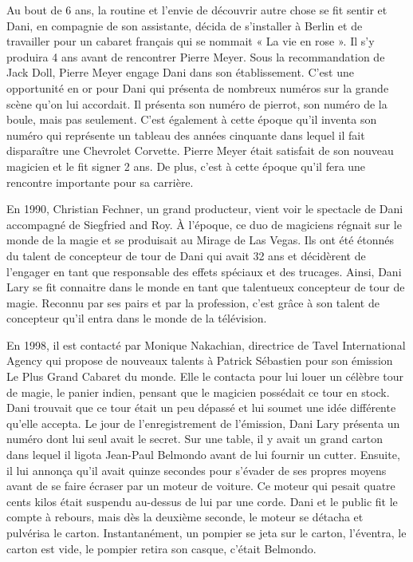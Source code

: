 Au bout de 6 ans, la routine et l’envie de découvrir autre chose se fit sentir et Dani, en compagnie de son assistante, décida de s’installer à Berlin et de travailler pour un cabaret français qui se nommait « La vie en rose ». Il s’y produira 4 ans avant de rencontrer Pierre Meyer. Sous la recommandation de Jack Doll, Pierre Meyer engage Dani dans son établissement. C’est une opportunité en or pour Dani qui présenta de nombreux numéros sur la grande scène qu'on lui accordait. Il présenta son numéro de pierrot, son numéro de la boule, mais pas seulement. C’est également à cette époque qu’il inventa son numéro qui représente un tableau des années cinquante dans lequel il fait disparaître une Chevrolet Corvette. Pierre Meyer était satisfait de son nouveau magicien et le fit signer 2 ans. De plus, c'est à cette époque qu’il fera une rencontre importante pour sa carrière.

En 1990, Christian Fechner, un grand producteur, vient voir le spectacle de Dani accompagné de Siegfried and Roy. À l’époque, ce duo de magiciens régnait sur le monde de la magie et se produisait au Mirage de Las Vegas. Ils ont été étonnés du talent de concepteur de tour de Dani qui avait 32 ans et décidèrent de l’engager en tant que responsable des effets spéciaux et des trucages. Ainsi, Dani Lary se fit connaitre dans le monde en tant que talentueux concepteur de tour de magie. Reconnu par ses pairs et par la profession, c’est grâce à son talent de concepteur qu'il entra dans le monde de la télévision. 

En 1998, il est contacté par Monique Nakachian, directrice de Tavel International Agency qui propose de nouveaux talents à Patrick Sébastien pour son émission Le Plus Grand Cabaret du monde. Elle le contacta pour lui louer un célèbre tour de magie, le panier indien, pensant que le magicien possédait ce tour en stock. Dani trouvait que ce tour était un peu dépassé et lui soumet une idée différente qu’elle accepta. Le jour de l’enregistrement de l’émission, Dani Lary présenta un numéro dont lui seul avait le secret. Sur une table, il y avait un grand carton dans lequel il ligota Jean-Paul Belmondo avant de lui fournir un cutter. Ensuite, il lui annonça qu'il avait quinze secondes pour s’évader de ses propres moyens avant de se faire écraser par un moteur de voiture. Ce moteur qui pesait quatre cents kilos était suspendu au-dessus de lui par une corde. Dani et le public fit le compte à rebours, mais dès la deuxième seconde, le moteur se détacha et pulvérisa le carton. Instantanément, un pompier se jeta sur le carton, l’éventra, le carton est vide, le pompier retira son casque, c'était Belmondo.

